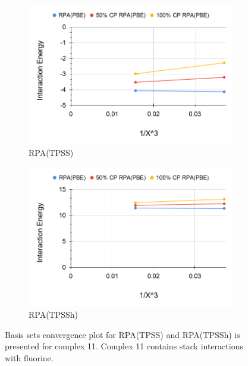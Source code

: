 \documentclass[11pt]{article}
\begin{document}
\begin{figure}[hbpt]
  \centering
  \begin{subfigure}{.5\textwidth}
    \centering
    \includegraphics[scale=0.3]{tpss-11.png}
    \caption{RPA(TPSS)}
    \label{fig:tpss11}
  \end{subfigure}%
  \begin{subfigure}{.5\textwidth}
    \centering
    \includegraphics[scale=0.3]{tpssh-11.png}
    \caption{RPA(TPSSh)}
    \label{fig:tpssh_11}
  \end{subfigure}
  \caption{Basis sets convergence plot for RPA(TPSS) and RPA(TPSSh) is
    presented for complex 11. Complex 11 contains stack interactions with
    fluorine.}
  \label{fig:complex_11}
\end{figure}
\end{document}
